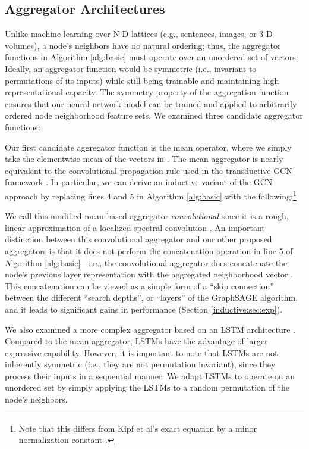 \subsection{Aggregator Architectures}\label{inductive:sec:aggs}

Unlike machine learning over N-D lattices (e.g., sentences, images, or 3-D volumes), a node's neighbors have no natural ordering; thus, the aggregator functions in Algorithm \ref{alg:basic} must operate over an unordered set of vectors.
Ideally, an aggregator function would be symmetric (i.e., invariant to permutations of its inputs) while still being trainable and maintaining high representational capacity. 
The symmetry property of the aggregation function ensures that our neural network model can be trained and applied to arbitrarily ordered node neighborhood feature sets.
We examined three candidate aggregator functions:

 Our first candidate aggregator function is the mean operator, where we simply take the elementwise mean of the vectors in .
The mean aggregator is nearly equivalent to the convolutional propagation rule used in the transductive GCN framework \cite{kipf2016semi}.
In particular, we can derive an inductive variant of the GCN approach by replacing lines 4 and 5 in Algorithm \ref{alg:basic} with the following:\footnote{Note that this differs from Kipf et al's exact equation by a minor normalization constant \cite{kipf2016semi}.}

We call this modified mean-based aggregator {\em convolutional} since it is a rough, linear approximation of a localized spectral convolution \cite{kipf2016semi}.
An important distinction between this convolutional aggregator and our other proposed aggregators is that it does not perform the concatenation operation in line 5 of Algorithm \ref{alg:basic}---i.e., the convolutional aggregator does concatenate the node's previous layer representation  with the aggregated neighborhood vector . 
This concatenation can be viewed as a simple form of a ``skip connection'' \cite{he2016identity} between the different ``search depths'', or ``layers'' of the GraphSAGE algorithm, and it leads to significant gains in performance (Section \ref{inductive:sec:exp}).  

 We also examined a more complex aggregator based on an LSTM architecture \cite{hochreiter1997long}. 
Compared to the mean aggregator, LSTMs have the advantage of larger expressive capability. However, it is important to note that LSTMs are not inherently symmetric (i.e., they are not permutation invariant), since they process their inputs in a sequential manner.
We adapt LSTMs to operate on an unordered set by simply applying the LSTMs to a random permutation of the node's neighbors. 

